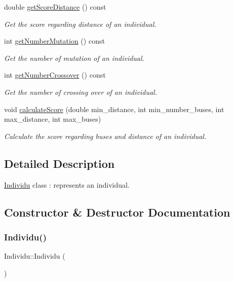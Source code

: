 \begin{DoxyCompactItemize}
double \hyperlink{class_individu_a5c6d2ec03c1a493a870ab1340c410e82}{get\+Score\+Distance} () const
\begin{DoxyCompactList}\small\item\em Get the score regarding distance of an individual. \end{DoxyCompactList}\item 
int \hyperlink{class_individu_ab45051503bc347df2977cded53e89bb8}{get\+Number\+Mutation} () const
\begin{DoxyCompactList}\small\item\em Get the number of mutation of an individual. \end{DoxyCompactList}\item 
int \hyperlink{class_individu_ac2b0760ade1996c858f847ce9c176c20}{get\+Number\+Crossover} () const
\begin{DoxyCompactList}\small\item\em Get the number of crossing over of an individual. \end{DoxyCompactList}\item 
void \hyperlink{class_individu_aaf98484035ad3c9d41cf12013a5c65fd}{calculate\+Score} (double min\+\_\+distance, int min\+\_\+number\+\_\+buses, int max\+\_\+distance, int max\+\_\+buses)
\begin{DoxyCompactList}\small\item\em Calculate the score regarding buses and distance of an individual. \end{DoxyCompactList}\end{DoxyCompactItemize}


\subsection{Detailed Description}
\hyperlink{class_individu}{Individu} class \+: represents an individual. 

\subsection{Constructor \& Destructor Documentation}
\mbox{\label{class_individu_ac35091404cfbf11946694806aefa9e7e}} 
\subsubsection{\texorpdfstring{Individu()}{Individu()}\hspace{0.1cm}{\footnotesize\ttfamily [1/2]}}
{\footnotesize\ttfamily Individu\+::\+Individu (\begin{DoxyParamCaption}{ }\end{DoxyParamCaption})}




